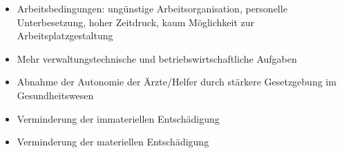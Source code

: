 \begin{itemize}
\begin{itemize}
    Patienten/Gesellschaft: Arzt/Helfer ist omnipotent, darf
    keine eigenen Bedürfnisse haben, Normen eines guten
    Helferverhaltens \item Arbeitsbedingungen: ungünstige
    Arbeitsorganisation, personelle Unterbesetzung, hoher
    Zeitdruck, kaum Möglichkeit zur Arbeitsplatzgestaltung
    \item Mehr verwaltungstechnische und
    betriebswirtschaftliche Aufgaben
    \item Abnahme der Autonomie der Ärzte/Helfer durch
    stärkere Gesetzgebung im Gesundheitswesen
    \item Verminderung der immateriellen Entschädigung
    \item Verminderung der materiellen Entschädigung
  \end{itemize}
\end{itemize}



